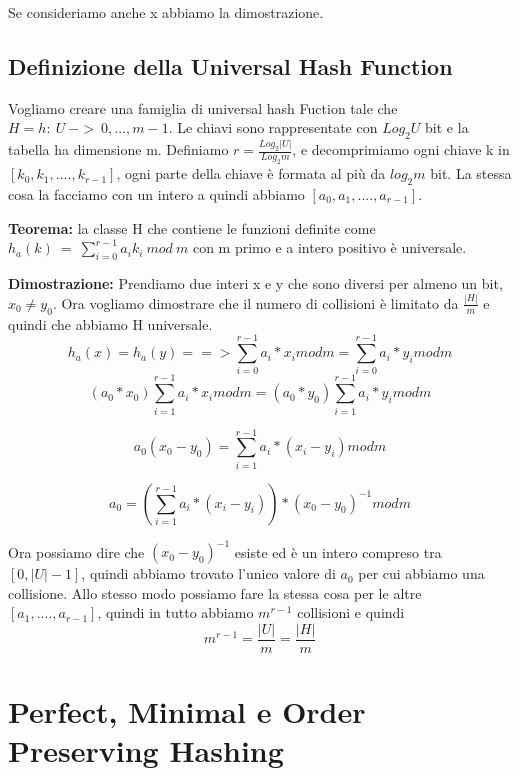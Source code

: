 \documentclass[14pt]{extreport}
\begin{document}
Se consideriamo anche x abbiamo la dimostrazione.

\subsection{Definizione della Universal Hash Function}

Vogliamo creare una famiglia di universal hash Fuction tale che $H = {h:\ U\ ->\ {0,...,m-1}}$. Le chiavi sono rappresentate con $Log_2 U $ bit e la tabella ha dimensione m.
Definiamo $r=\frac{Log_2 |U|}{Log_2 m}$, e decomprimiamo ogni chiave k in $[k_0,k_1,....,k_{r-1}]$, ogni parte della chiave è formata al più da $log_2 m$ bit. La stessa cosa la facciamo con un intero a quindi abbiamo $[a_0,a_1,....,a_{r-1}]$.

\textbf{Teorema: } la classe H che contiene le funzioni definite come $h_a(k)\ =\ \sum^{r-1}_{i=0}a_ik_i\ mod\ m$ con m primo e a intero positivo è universale.

\textbf{Dimostrazione: } Prendiamo due interi x e y che sono diversi per almeno un bit, $x_0 \neq y_0$. 
Ora vogliamo dimostrare che il numero di collisioni è limitato da $\frac{|H|}{m}$ e quindi che abbiamo H universale.
\begin{equation}
h_a(x) = h_a(y) ==> \sum^{r-1}_{i=0} a_i*x_i mod m = \sum^{r-1}_{i=0} a_i*y_i mod m 
\end{equation}
\begin{equation}
 (a_0*x_0)\sum^{r-1}_{i=1} a_i*x_i mod m = (a_0*y_0)\sum^{r-1}_{i=1} a_i*y_i mod m
\end{equation}

\begin{equation}
a_0(x_0-y_0) = \sum^{r-1}_{i=1} a_i*(x_i-y_i) mod m
\end{equation}

\begin{equation}
a_0 = (\sum^{r-1}_{i=1} a_i*(x_i-y_i))*(x_0-y_0)^{-1} mod m
\end{equation}

Ora possiamo dire che $(x_0-y_0)^{-1}$ esiste ed è un intero compreso tra $[0,|U|-1]$, quindi abbiamo trovato l'unico valore di $a_0$ per cui abbiamo una collisione. Allo stesso modo possiamo fare la stessa cosa per le altre $[a_1,....,a_{r-1}]$, quindi in tutto abbiamo $m^{r-1}$ collisioni e quindi 
\begin{equation}
m^{r-1} = \frac{|U|}{m} = \frac{|H|}{m}
\end{equation}

\section{Perfect, Minimal e Order Preserving Hashing}
\end{document}

